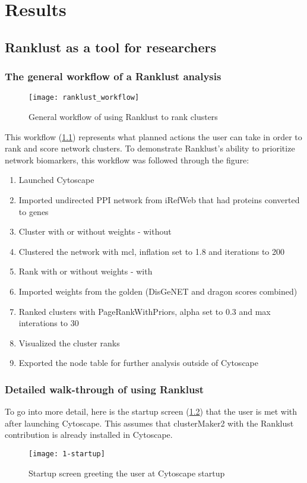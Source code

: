 \part{Results}
\label{pa:results}
\chapter{Ranklust as a tool for researchers}
\section{The general workflow of a Ranklust analysis}
\begin{figure}[H]
    \texttt{[image: ranklust\_workflow]}
    \caption{General workflow of using Ranklust to rank clusters}
    \label{fig:ranklust-workflow}
\end{figure}
This workflow (\ref{fig:ranklust-workflow}) represents what planned actions the
user can take in order to rank and score network clusters. To demonstrate
Ranklust's ability to prioritize network biomarkers, this workflow was followed
through the figure:

\begin{enumerate}
    \item Launched Cytoscape
    \item Imported undirected PPI network from iRefWeb that had proteins converted to genes
    \item Cluster with or without weights - without
    \item Clustered the network with \gls{mcl}, inflation set to 1.8 and iterations to 200
    \item Rank with or without weights - with
    \item Imported weights from the \gls{golden} (DisGeNET and \gls{dragon} scores combined)
    \item Ranked clusters with PageRankWithPriors, alpha set to 0.3 and max interations to 30
    \item Visualized the cluster ranks
    \item Exported the node table for further analysis outside of Cytoscape
\end{enumerate}

\section{Detailed walk-through of using Ranklust}
To go into more detail, here is the startup screen (\ref{fig:startup}) that the
user is met with after launching Cytoscape. This assumes that clusterMaker2 with
the Ranklust contribution is already installed in Cytoscape.
\begin{figure}[H]
    \texttt{[image: 1-startup]}
    \caption{Startup screen greeting the user at Cytoscape startup}
    \label{fig:startup}
\end{figure}

